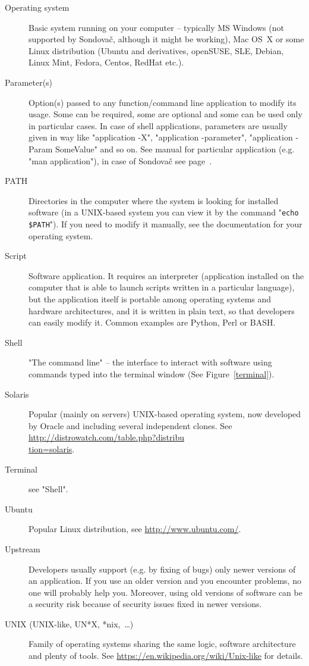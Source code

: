 \documentclass[a4paper, 11pt, twoside]{article}
\begin{document}
\begin{description}
\item[Operating system] Basic system running on your computer -- typically MS Windows (not supported by Sondovač, although it might be working), Mac OS~X or some Linux distribution (Ubuntu and derivatives, openSUSE, SLE, Debian, Linux Mint, Fedora, Centos, RedHat etc.).
\item[Parameter(s)] Option(s) passed to any function/command line application to modify its usage. Some can be required, some are optional and some can be used only in particular cases. In case of shell applications, parameters are usually given in way like "application -X", "application -parameter", "application -Param SomeValue" and so on. See manual for particular application (e.g. "man application"), in case of Sondovač see page~\pageref{script-usage}.
\item[PATH] Directories in the computer where the system is looking for installed software (in a UNIX-based system you can view it by the command "\texttt{echo \$PATH}"). If you need to modify it manually, see the documentation for your operating system.
\item[Script] Software application. It requires an interpreter (application installed on the computer that is able to launch scripts written in a particular language), but the application itself is portable among operating systems and hardware architectures, and it is written in plain text, so that developers can easily modify it. Common examples are Python, Perl or BASH.
\item[Shell] "The command line" -- the interface to interact with software using commands typed into the terminal window (See Figure~\ref{terminal}).
\item[Solaris] Popular (mainly on servers) UNIX-based operating system, now developed by Oracle and including several independent clones. See \href{http://distrowatch.com/table.php?distribution=solaris}{http://distrowatch.com/table.php?distribu\\tion=solaris}.
\item[Terminal] see "Shell".
\item[Ubuntu] Popular Linux distribution, see \href{http://www.ubuntu.com/}{http://www.ubuntu.com/}.
\item[Upstream] Developers usually support (e.g. by fixing of bugs) only newer versions of an application. If you use an older version and you encounter problems, no one will probably help you. Moreover, using old versions of software can be a security risk because of security issues fixed in newer versions.
\item[UNIX (UNIX-like, UN*X, *nix,~\ldots)] Family of operating systems sharing the same logic, software architecture and plenty of tools. See \href{https://en.wikipedia.org/wiki/Unix-like}{https://en.wikipedia.org/wiki/Unix-like} for details.
\end{description}
\end{document}
